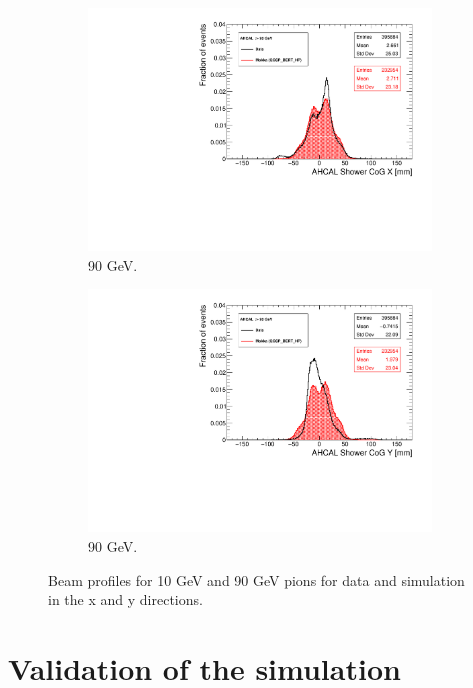 \begin{figure}[htbp!]
\begin{subfigure}[t]{0.49\textwidth}
    \includegraphics[width=1.\linewidth]{../Thesis_Plots/Timing/Pions/Plots/Run24332_CoGX_AHCAL_90GeV_Comparison.pdf}
    \caption{90 GeV.} \label{fig:pi90GeVX}
  \end{subfigure}
  \hfill
  \begin{subfigure}[t]{0.49\textwidth}
    \includegraphics[width=1.\linewidth]{../Thesis_Plots/Timing/Pions/Plots/Run24332_CoGY_AHCAL_90GeV_Comparison.pdf}
    \caption{90 GeV.} \label{fig:pi90GeVY}
  \end{subfigure}
  \caption{Beam profiles for 10 GeV and 90 GeV pions for data and simulation in the x and y directions.}
  \label{fig:BPpi}
\end{figure}

\section{Validation of the simulation}

